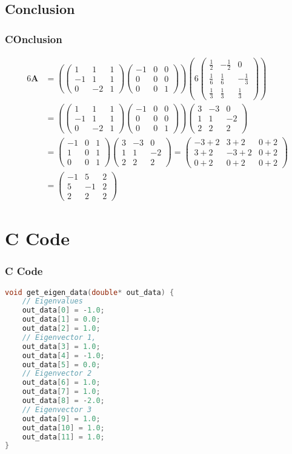 \documentclass{beamer}
\providecommand{\brak}[1]{\ensuremath{\left(#1\right)}}
\theoremstyle{remark}
\newcommand{\myvec}[1]{\ensuremath{\begin{pmatrix}#1\end{pmatrix}}}
\let\vec\mathbf
\numberwithin{equation}{section}
\begin{document}
\subsection{Conclusion}
\frametitle{COnclusion}
\begin{frame}[fragile]
 \begin{align}
6\vec{A}&=\brak{\myvec{1&1&1\\-1&1&1\\0&-2&1}\myvec{-1&0&0\\0&0&0\\0&0&1}}\brak{6\myvec{\frac{1}{2} & -\frac{1}{2} & 0 \\\frac{1}{6} & \frac{1}{6} & -\frac{1}{3}\\ \frac{1}{3} & \frac{1}{3} & \frac{1}{3}}}\\
&=\brak{\myvec{1&1&1\\-1&1&1\\0&-2&1}\myvec{-1&0&0\\0&0&0\\0&0&1} }\myvec{3 & -3 & 0 \\1 & 1 & -2\\ 2 & 2 & 2}\\
&=\myvec{-1 & 0 & 1 \\ 1& 0 & 1 \\0 & 0 & 1}\myvec{3 & -3 & 0 \\1 & 1 & -2\\ 2 & 2 & 2}
=\myvec{-3+2& 3+2&0+2\\3+2&-3+2&0+2\\0+2&0+2&0+2} \\
&=\myvec{-1&5&2\\5&-1&2\\2&2&2}
\end{align}
\end{frame}

\section{C Code}
\begin{frame}[fragile]
\frametitle{C Code}
\begin{lstlisting}[language=C]
void get_eigen_data(double* out_data) {
    // Eigenvalues
    out_data[0] = -1.0;
    out_data[1] = 0.0;
    out_data[2] = 1.0;
    // Eigenvector 1,
    out_data[3] = 1.0;
    out_data[4] = -1.0;
    out_data[5] = 0.0;
    // Eigenvector 2
    out_data[6] = 1.0;
    out_data[7] = 1.0;
    out_data[8] = -2.0;
    // Eigenvector 3
    out_data[9] = 1.0;
    out_data[10] = 1.0;
    out_data[11] = 1.0;
}
\end{lstlisting}
\end{frame}
\end{document}
